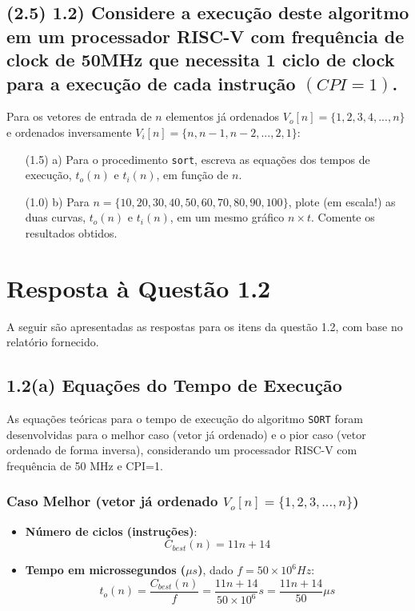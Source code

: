 \documentclass[12pt,a4paper]{article}
\begin{document}
\subsection*{(2.5) 1.2) Considere a execução deste algoritmo em um processador RISC-V com frequência de clock de 50MHz que necessita 1 ciclo de clock para a execução de cada instrução $(CPI=1)$.}
Para os vetores de entrada de $n$ elementos já ordenados $V_{o}[n]=\{1,2,3,4,...,n\}$ e ordenados inversamente $V_{i}[n]=\{n,n-1,n-2,...,2,1\}$:

\begin{enumerate}
    \item[(1.5) a)] Para o procedimento \texttt{sort}, escreva as equações dos tempos de execução, $t_{o}(n)$ e $t_{i}(n)$, em função de $n$.
    \item[(1.0) b)] Para $n=\{10,20,30,40,50,60,70,80,90,100\}$, plote (em escala!) as duas curvas, $t_{o}(n)$ e $t_{i}(n)$, em um mesmo gráfico $n \times t$. Comente os resultados obtidos.
\end{enumerate}

\section*{Resposta à Questão 1.2}

A seguir são apresentadas as respostas para os itens da questão 1.2, com base no relatório fornecido.

\subsection*{1.2(a) Equações do Tempo de Execução}

As equações teóricas para o tempo de execução do algoritmo \texttt{SORT} foram desenvolvidas para o melhor caso (vetor já ordenado) e o pior caso (vetor ordenado de forma inversa), considerando um processador RISC-V com frequência de 50 MHz e CPI=1.

\subsubsection*{Caso Melhor (vetor já ordenado $V_{o}[n]=\{1,2,3,...,n\}$)}
\begin{itemize}
    \item \textbf{Número de ciclos (instruções)}:
    $$ C_{best}(n) = 11n + 14 $$
    \item \textbf{Tempo em microssegundos ($\mu s$)}, dado $f=50 \times 10^{6} Hz$:
    $$ t_{o}(n) = \frac{C_{best}(n)}{f} = \frac{11n + 14}{50 \times 10^{6}}s = \frac{11n + 14}{50}\mu s $$
\end{itemize}
\end{document}
